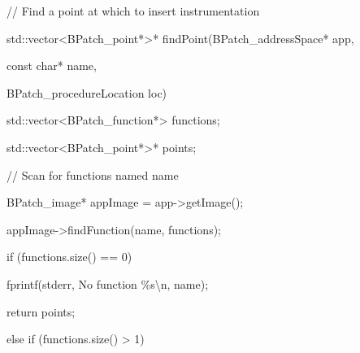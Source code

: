 {\bigskip





\bigskip



{

// Find a point at which to insert instrumentation}



{

std::vector<BPatch_point*>* findPoint(BPatch_addressSpace* app,



{

const char* name,



{

BPatch_procedureLocation loc) {}



{

std::vector<BPatch_function*> functions;}



{

std::vector<BPatch_point*>* points;}





\bigskip



{

// Scan for functions named {\textquotedbl}name{\textquotedbl}}



{

BPatch_image* appImage = app->getImage();}



{

appImage->findFunction(name, functions);}



{

if (functions.size() == 0) {}



{

fprintf(stderr, {\textquotedbl}No function \%s{\textbackslash}n{\textquotedbl}, name);}



{

return points;}



{

} else if (functions.size() > 1) {}



{

}}}}}}
